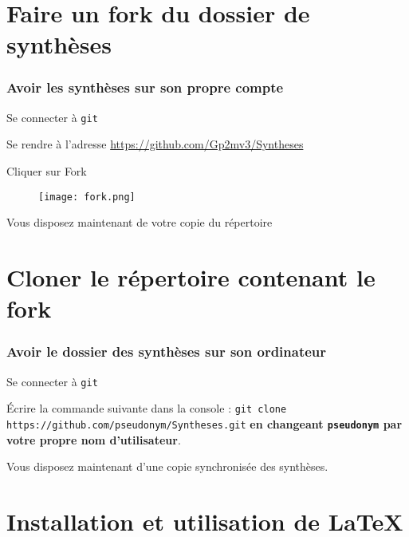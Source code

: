\documentclass{beamer}
\newenvironment{wideitemize}{\itemize\addtolength{\itemsep}{10pt}}{\enditemize}
\begin{document}
\section{Faire un fork du dossier de synthèses}

\begin{frame}
	\frametitle{Avoir les synthèses sur son propre compte}
		\begin{wideitemize}
			\item Se connecter à \lstinline|git|
			\pause
			\item Se rendre à l'adresse
                \url{https://github.com/Gp2mv3/Syntheses}
			\pause
			\item Cliquer sur Fork
                \begin{figure}[H]
                    \centering
                    \texttt{[image: fork.png]}
                \end{figure}
			\pause
			\item Vous disposez maintenant de votre copie du répertoire
		\end{wideitemize}
\end{frame}

\section{Cloner le répertoire contenant le fork}

\begin{frame}[fragile]
    \frametitle{Avoir le dossier des synthèses sur son ordinateur}
    \begin{wideitemize}
        \item Se connecter à \lstinline|git|
        \pause
        \item Écrire la commande suivante dans la console :
            \lstinline[mathescape]|git clone https://github.com/pseudonym/Syntheses.git| \textbf{en changeant \lstinline|pseudonym| par votre propre nom d'utilisateur}.
        \pause
        \item Vous disposez maintenant d'une copie synchronisée des
            synthèses.
    \end{wideitemize}
\end{frame}

\section{Installation et utilisation de \LaTeX}
\end{document}
